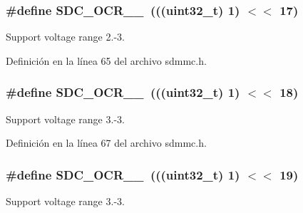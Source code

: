 \subsubsection[{\texorpdfstring{S\+D\+C\+\_\+\+O\+C\+R\+\_\+29\+\_\+30}{SDC_OCR_29_30}}]{\setlength{\rightskip}{0pt plus 5cm}\#define S\+D\+C\+\_\+\+O\+C\+R\+\_\+\_~(((uint32\+\_\+t) 1) $<$$<$ 17)}\hypertarget{group___c_h_i_p___s_d_m_m_c___definitions_gaca5e2d08e3ca92f47754e682ca33b3fa}{}\label{group___c_h_i_p___s_d_m_m_c___definitions_gaca5e2d08e3ca92f47754e682ca33b3fa}
Support voltage range 2.-\/3. 

Definición en la línea 65 del archivo sdmmc.\+h.

\subsubsection[{\texorpdfstring{S\+D\+C\+\_\+\+O\+C\+R\+\_\+30\+\_\+31}{SDC_OCR_30_31}}]{\setlength{\rightskip}{0pt plus 5cm}\#define S\+D\+C\+\_\+\+O\+C\+R\+\_\+\_~(((uint32\+\_\+t) 1) $<$$<$ 18)}\hypertarget{group___c_h_i_p___s_d_m_m_c___definitions_gac8ac6e078fd87273ccf1414c8a973eda}{}\label{group___c_h_i_p___s_d_m_m_c___definitions_gac8ac6e078fd87273ccf1414c8a973eda}
Support voltage range 3.-\/3. 

Definición en la línea 67 del archivo sdmmc.\+h.

\subsubsection[{\texorpdfstring{S\+D\+C\+\_\+\+O\+C\+R\+\_\+31\+\_\+32}{SDC_OCR_31_32}}]{\setlength{\rightskip}{0pt plus 5cm}\#define S\+D\+C\+\_\+\+O\+C\+R\+\_\+\_~(((uint32\+\_\+t) 1) $<$$<$ 19)}\hypertarget{group___c_h_i_p___s_d_m_m_c___definitions_gabb0e4fcb66d89b85b06b3a582a3ff7fc}{}\label{group___c_h_i_p___s_d_m_m_c___definitions_gabb0e4fcb66d89b85b06b3a582a3ff7fc}
Support voltage range 3.-\/3. 

